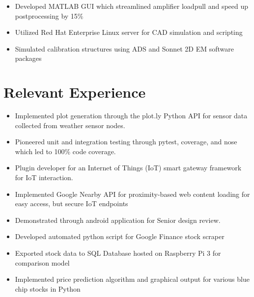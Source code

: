 \documentclass{resume}
\begin{document}
\begin{itemize}[noitemsep,nolistsep]
  \item Developed MATLAB GUI which streamlined amplifier loadpull and speed up postprocessing by 15\%
  \item Utilized Red Hat Enterprise Linux server for CAD simulation and scripting
  \item Simulated calibration structures using ADS and Sonnet 2D EM software packages
\end{itemize}

\section{%
Relevant Experience}

\begin{itemize}[noitemsep, nolistsep]
  \item Implemented plot generation through the plot.ly Python API for sensor data collected from weather sensor nodes.
  \item Pioneered unit and integration testing through pytest, coverage, and nose which led to 100\% code coverage.
\end{itemize}

\begin{itemize}[noitemsep, nolistsep]
  \item Plugin developer for an Internet of Things (IoT) smart gateway framework for IoT interaction.
  \item Implemented Google Nearby API for proximity-based web content loading for easy access, but secure IoT endpoints
  \item Demonstrated through android application for Senior design review.
  \end{itemize}

\begin{itemize}[noitemsep, nolistsep]
  \item Developed automated python script for Google Finance stock scraper
  \item Exported stock data to SQL Database hosted on Raspberry Pi 3 for comparison model
  \item Implemented price prediction algorithm and graphical output for various blue chip stocks in Python
\end{itemize}
\end{document}

